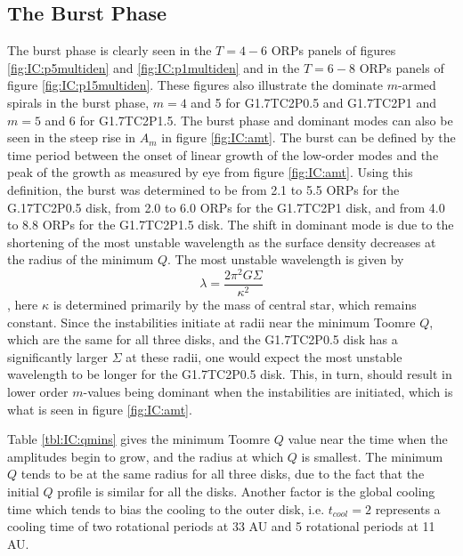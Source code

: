 \subsection{The Burst Phase}

The burst phase is clearly seen in the $T = 4-6$ ORPs panels of figures \ref{fig:IC:p5multiden} and \ref{fig:IC:p1multiden} and in the $T = 6-8$ ORPs panels of figure \ref{fig:IC:p15multiden}. These figures also illustrate the dominate $m$-armed spirals in the burst phase, $m=4$ and 5 for G1.7TC2P0.5 and G1.7TC2P1 and $m=5$ and 6 for G1.7TC2P1.5. The burst phase and dominant modes can also be seen in the steep rise in $A_m$ in figure \ref{fig:IC:amt}. The burst can be defined by the time period between the onset of linear growth of the low-order modes and the peak of the growth as measured by eye from figure \ref{fig:IC:amt}. Using this definition, the burst was determined to be from 2.1 to 5.5 ORPs for the G.17TC2P0.5 disk, from 2.0 to 6.0 ORPs for the G1.7TC2P1 disk, and from 4.0 to 8.8 ORPs for the G1.7TC2P1.5 disk. The shift in dominant mode is due to the shortening of the most unstable wavelength as the surface density decreases at the radius of the minimum $Q$. The most unstable wavelength is given by 
\begin{equation}
\lambda = \frac{2\pi^2 G \Sigma}{\kappa^2}
\end{equation}
 \citep{toomre1981}, here $\kappa$ is determined primarily by the mass of central star, which remains constant. Since the instabilities initiate at radii near the minimum Toomre $Q$, which are the same for all three disks, and the G1.7TC2P0.5 disk has a significantly larger $\Sigma$ at these radii, one would expect the most unstable wavelength to be longer for the G1.7TC2P0.5 disk. This, in turn, should result in lower order $m$-values being dominant when the instabilities are initiated, which is what is seen in figure \ref{fig:IC:amt}. 

Table \ref{tbl:IC:qmins} gives the minimum Toomre $Q$ value near the time when the amplitudes begin to grow, and the radius at which $Q$ is smallest. The minimum $Q$ tends to be at the same radius for all three disks, due to the fact that the initial $Q$ profile is similar for all the disks. Another factor is the global cooling time which tends to bias the cooling to the outer disk, i.e. $t_{cool} =2$ represents a cooling time of two rotational periods at 33 AU and 5 rotational periods at 11 AU. 

